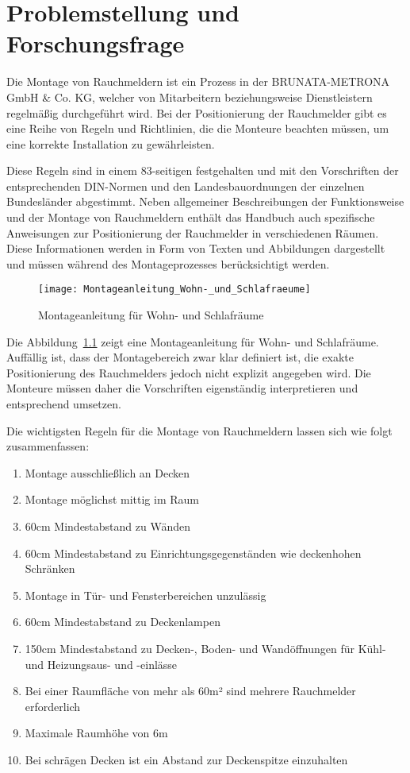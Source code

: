 \chapter{Problemstellung und Forschungsfrage} \label{cha:Problemstellung}

Die Montage von Rauchmeldern ist ein Prozess in der BRUNATA-METRONA GmbH \& Co. KG, welcher von Mitarbeitern beziehungsweise Dienstleistern regelmäßig durchgeführt wird. Bei der Positionierung der Rauchmelder gibt es eine Reihe von Regeln und Richtlinien, die die Monteure beachten müssen, um eine korrekte Installation zu gewährleisten. 

Diese Regeln sind in einem 83-seitigen \citet{brunata2023handbuch} festgehalten und mit den Vorschriften der entsprechenden DIN-Normen und den Landesbauordnungen der einzelnen Bundesländer abgestimmt. Neben allgemeiner Beschreibungen der Funktionsweise und der Montage von Rauchmeldern enthält das Handbuch auch spezifische Anweisungen zur Positionierung der Rauchmelder in verschiedenen Räumen. Diese Informationen werden in Form von Texten und Abbildungen dargestellt und müssen während des Montageprozesses berücksichtigt werden.


\begin{figure}
\centering
\texttt{[image: Montageanleitung\_Wohn-\_und\_Schlafraeume]}
\caption{Montageanleitung für Wohn- und Schlafräume \cite{brunata2023handbuch}\label{fig:Anleitung}}\par
\end{figure}

Die Abbildung~\ref{fig:Anleitung} zeigt eine Montageanleitung für Wohn- und Schlafräume. Auffällig ist, dass der Montagebereich zwar klar definiert ist, die exakte Positionierung des Rauchmelders jedoch nicht explizit angegeben wird. Die Monteure müssen daher die Vorschriften eigenständig interpretieren und entsprechend umsetzen.

Die wichtigsten Regeln für die Montage von Rauchmeldern lassen sich wie folgt zusammenfassen:

\begin{enumerate}
    \item Montage ausschließlich an Decken
    \item Montage möglichst mittig im Raum
    \item 60cm Mindestabstand zu Wänden
    \item 60cm Mindestabstand zu Einrichtungsgegenständen wie deckenhohen Schränken
    \item Montage in Tür- und Fensterbereichen unzulässig
    \item 60cm Mindestabstand zu Deckenlampen
    \item 150cm Mindestabstand zu Decken-, Boden- und Wandöffnungen für Kühl- und Heizungsaus- und -einlässe 
    \item Bei einer Raumfläche von mehr als 60m² sind mehrere Rauchmelder erforderlich
    \item Maximale Raumhöhe von 6m
    \item Bei schrägen Decken ist ein Abstand zur Deckenspitze einzuhalten
\end{enumerate}


